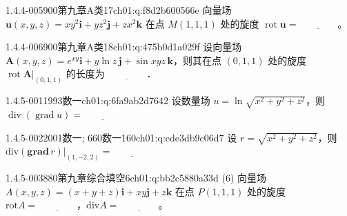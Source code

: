 \begin{q}{1.4.4-005}{900第九章A类17}{ch01:q:f8d2b600566e}
向量场 $\boldsymbol{u}(x,y,z)=xy^2\boldsymbol{i}+yz^2\boldsymbol{j}+zx^2\boldsymbol{k}$ 在点 $M(1,1,1)$ 处的旋度 $\operatorname{rot}\boldsymbol{u}=\underline{\hspace{4em}}$。
\end{q}

\begin{q}{1.4.4-006}{900第九章A类18}{ch01:q:475b0d1a029f}
设向量场 $\boldsymbol{A}(x,y,z)=e^{xy}\boldsymbol{i}+y\ln z\,\boldsymbol{j}+\sin xyz\,\boldsymbol{k}$，则其在点 $(0,1,1)$ 处的旋度 $\operatorname{rot}\boldsymbol{A}\big|_{(0,1,1)}$ 的长度为 $\underline{\hspace{4em}}$．
\end{q}

\par\addvspace{2.4ex}\noindent
\begin{minipage}{\linewidth}

\begin{q}{1.4.5-001}{1993数一}{ch01:q:6fa9ab2d7642}
设数量场 $u=\ln\sqrt{x^2+y^2+z^2}$，则 $\operatorname{div}(\operatorname{grad}u)=\underline{\hspace{4em}}$
\end{q}
\end{minipage}


\begin{q}{1.4.5-002}{2001数一; 660数一160}{ch01:q:ede3db9c06d7}
设 $r=\sqrt{x^2+y^2+z^2}$，则 $\mathrm{div}(\mathbf{grad}\,r)\big|_{(1,-2,2)}=\underline{\hspace{4em}}$
\end{q}

\begin{q}{1.4.5-003}{880第九章综合填空6}{ch01:q:bb2c5880a33d}
(6) 向量场 $A(x,y,z)=(x+y+z)\boldsymbol{i}+xy\boldsymbol{j}+z\boldsymbol{k}$ 在点 $P(1,1,1)$ 处的旋度 $\mathrm{rot}A=\underline{\hspace{4em}}$，$\mathrm{div}A=\underline{\hspace{4em}}$。
\end{q}
